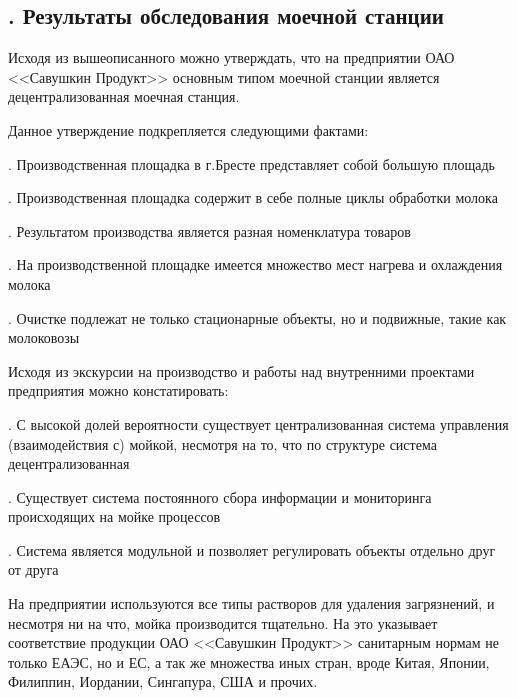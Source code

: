 \subtitlespace

\subsection*{ 
  \gostTitleFont
  \redline
  \thechaptercntr .\thesubchaptercntr \spc
  Результаты обследования моечной станции
} \addtocounter{subchaptercntr}{1}

\subtitlespace

{\gostFont

  \par \redline Исходя из вышеописанного можно утверждать, что на предприятии ОАО <<Савушкин Продукт>> основным типом моечной станции является децентрализованная моечная станция.
  
  \par \redline Данное утверждение подкрепляется следующими фактами: 
  
  \par {}. Производственная площадка в г.Бресте представляет собой большую площадь
  \par {}. Производственная площадка содержит в себе полные циклы обработки молока
  \par {}. Результатом производства является разная номенклатура товаров
  \par {}. На производственной площадке имеется множество мест нагрева и охлаждения молока
  \par {}. Очистке подлежат не только стационарные объекты, но и подвижные, такие как молоковозы
  
  \par \redline Исходя из экскурсии на производство и работы над внутренними проектами предприятия можно констатировать:
  
  \par {}. С высокой долей вероятности существует централизованная система управления (взаимодействия с) мойкой, несмотря на то, что по структуре система децентрализованная
  \par {}. Существует система постоянного сбора информации и мониторинга происходящих на мойке процессов
  \par {}. Система является модульной и позволяет регулировать объекты отдельно друг от друга
  
  \par \redline На предприятии используются все типы растворов для удаления загрязнений, и несмотря ни на что, мойка производится тщательно. На это указывает соответствие продукции ОАО <<Савушкин Продукт>> санитарным нормам не только ЕАЭС, но и ЕС, а так же множества иных стран, вроде Китая, Японии, Филиппин, Иордании, Сингапура, США и прочих.
  
}
